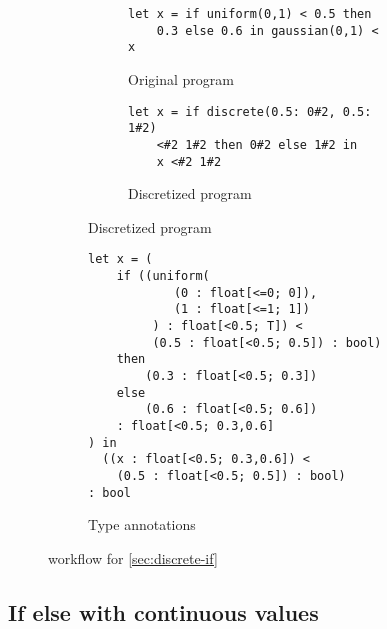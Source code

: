 \documentclass[acmsmall,screen,dvipsnames,x11names,nonacm,anonymous,review]{acmart}
\newcommand{\contdice}{\text{\scshape ContDice}\xspace}
\begin{document}
\begin{figure}[ht]
\centering
\begin{subfigure}[t]{0.48\textwidth}  %
  \centering
  \begin{subfigure}[t]{\textwidth}
    \begin{lstlisting}
let x = if uniform(0,1) < 0.5 then 
    0.3 else 0.6 in gaussian(0,1) < x
    \end{lstlisting}
    \caption{Original program}
    \label{fig:subA}
  \end{subfigure}

  \vspace{2em} %

  \begin{subfigure}[t]{\textwidth}
    \begin{lstlisting}
let x = if discrete(0.5: 0#2, 0.5: 1#2) 
    <#2 1#2 then 0#2 else 1#2 in
    x <#2 1#2
    \end{lstlisting}
    \caption{Discretized program}
    \label{fig:subC}
  \end{subfigure}
\end{subfigure}
\hfill
\begin{subfigure}[t]{0.48\textwidth}
  \begin{lstlisting}
let x = (
    if ((uniform(
            (0 : float[<=0; 0]), 
            (1 : float[<=1; 1])
         ) : float[<0.5; T]) < 
         (0.5 : float[<0.5; 0.5]) : bool) 
    then
        (0.3 : float[<0.5; 0.3])
    else
        (0.6 : float[<0.5; 0.6])
    : float[<0.5; 0.3,0.6]
) in
  ((x : float[<0.5; 0.3,0.6]) < 
    (0.5 : float[<0.5; 0.5]) : bool) 
: bool
  \end{lstlisting}
  \caption{Type annotations}
  \label{fig:subB}
\end{subfigure}

\caption{\contdice workflow for \ref{sec:discrete-if}}
\label{fig:main}
\end{figure}


\subsection{If else with continuous values}
\label{sec:continuous-if}
\end{document}
